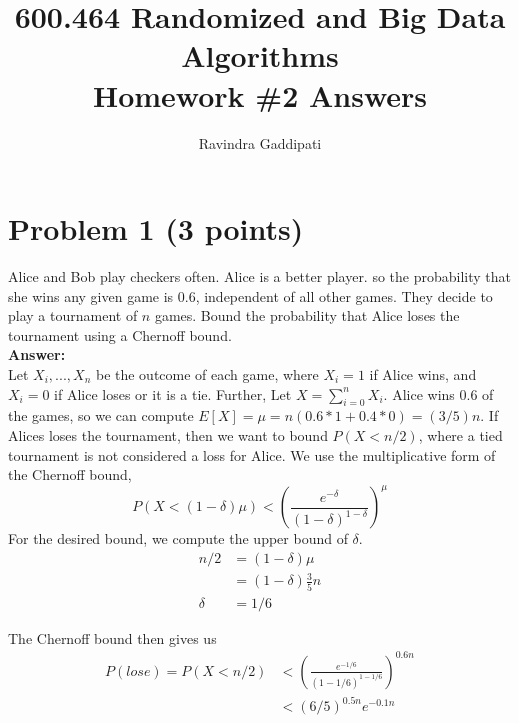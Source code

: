 \documentclass[letterpaper, 11pt]{article}
\begin{document}
\renewcommand{\theenumi}{\alph{enumi}}



\title{600.464 Randomized and Big Data Algorithms \\ Homework \#2 Answers}
\author{Ravindra Gaddipati}


\maketitle

\pagebreak
\section*{Problem 1 (3 points)}
Alice and Bob play checkers often. Alice is a better player. so the probability that she wins any given game is 0.6, independent of all other games. They decide to play a tournament of $n$ games. Bound the probability that Alice loses the tournament using a Chernoff bound. \\
\textbf{Answer:} \\
Let $X_i,...,X_n$ be the outcome of each game, where $X_i = 1$ if Alice wins, and $X_i = 0$ if Alice loses or it is a tie. Further, Let $X = \sum_{i=0}^n X_i$. Alice wins 0.6 of the games, so we can compute $E[X] = \mu = n(0.6 * 1 + 0.4*0) = (3/5)n$. If Alices loses the tournament, then we want to bound $P(X < n/2)$, where a tied tournament is not considered a loss for Alice. We use the multiplicative form of the Chernoff bound,
$$P(X < (1-\delta)\mu) < \left(\frac{e^{-\delta}}{(1-\delta)^{1-\delta}}\right)^\mu$$
For the desired bound, we compute the upper bound of $\delta$.
\begin{align*}
n/2 &= (1-\delta)\mu \\ 
&= (1-\delta)\frac{3}{5}n \\
\delta &= 1/6
\end{align*}

The Chernoff bound then gives us
\begin{align*}
	P(lose) = P(X < n/2) &< \left(\frac{e^{-1/6}}{(1-1/6)^{1-1/6}}\right)^{0.6n} \\
	&< (6/5)^{0.5n}e^{-0.1n}
\end{align*}

\pagebreak
\end{document}

